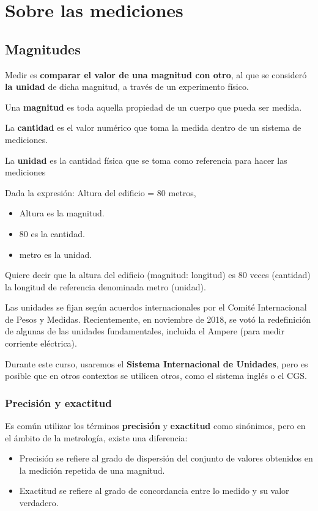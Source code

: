 
\chapter{Sobre las mediciones}
\section{Magnitudes}
Medir es \textbf{comparar el valor de una magnitud con otro}, al que se consideró \textbf{la unidad} de dicha magnitud, a través de un experimento físico.

Una \textbf{magnitud} es toda aquella propiedad de un cuerpo que pueda ser medida.

La \textbf{cantidad} es el valor numérico que toma la medida dentro de un sistema de mediciones.

La \textbf{unidad} es la cantidad física que se toma como referencia para hacer las mediciones

\begin{ejemplo}
	Dada la expresión: Altura del edificio = 80 metros,
	\begin{itemize}
		\item Altura es la magnitud.
		\item 80 es la cantidad.
		\item metro es la unidad.
	\end{itemize}
	
	Quiere decir que la altura del edificio (magnitud: longitud) es 80 veces (cantidad) la longitud de referencia denominada metro (unidad).
\end{ejemplo}

Las unidades se fijan según acuerdos internacionales por el Comité Internacional de Pesos y Medidas. Recientemente, en noviembre de 2018, se votó la redefinición de algunas de las unidades fundamentales, incluida el Ampere (para medir corriente eléctrica).

Durante este curso, usaremos el \textbf{Sistema Internacional de Unidades}, pero es posible que en otros contextos se utilicen otros, como el sistema inglés o el CGS.
\subsection{Precisión y exactitud}
	Es común utilizar los términos \textbf{precisión} y \textbf{exactitud} como sinónimos, pero en el ámbito de la metrología, existe una diferencia:
	\begin{itemize}
		\item Precisión se refiere al grado de dispersión del conjunto de valores obtenidos en la medición repetida de una magnitud.
		\item Exactitud se refiere al grado de concordancia entre lo medido y su valor verdadero.
	\end{itemize}
